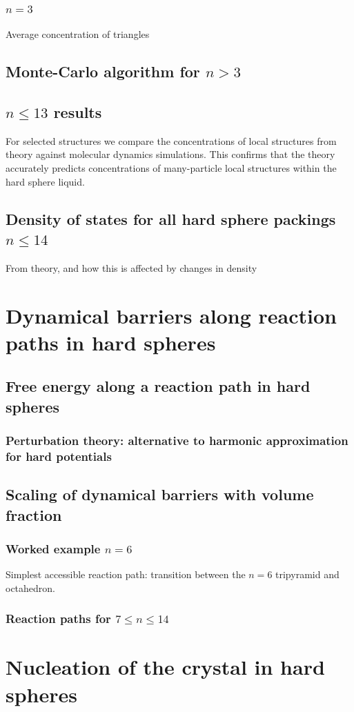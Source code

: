 \documentclass[11pt,twoside]{report}
\begin{document}
\subsubsection{$n = 3$}
Average concentration of triangles
\subsection{Monte-Carlo algorithm for $n > 3$}
\subsection{$n \le 13$ results}
For selected structures we compare the concentrations of local structures from theory against molecular dynamics simulations.
This confirms that the theory accurately predicts concentrations of many-particle local structures within the hard sphere liquid.
\subsection{Density of states for all hard sphere packings $n \le 14$}
From theory, and how this is affected by changes in density

\section{Dynamical barriers along reaction paths in hard spheres}
\subsection{Free energy along a reaction path in hard spheres}
\subsubsection{Perturbation theory: alternative to harmonic approximation for hard potentials}
\subsection{Scaling of dynamical barriers with volume fraction}
\subsubsection{Worked example $n = 6$}
Simplest accessible reaction path: transition between the $n = 6$ tripyramid and octahedron.
\subsubsection{Reaction paths for $7 \le n \le 14$}

\section{Nucleation of the crystal in hard spheres}
\end{document}
